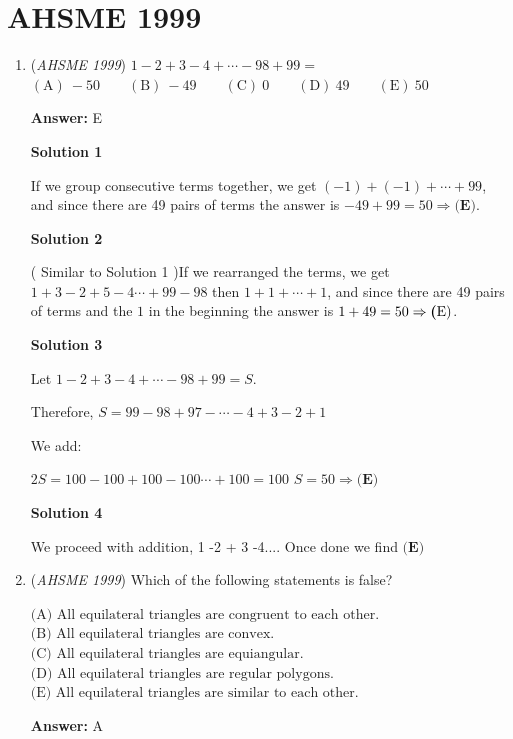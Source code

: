 \section{AHSME 1999}
        \begin{enumerate}
        	\item (\textit{AHSME 1999}) $1 - 2 + 3 -4 + \cdots - 98 + 99 =$
$\mathrm{(A) \ -50 } \qquad \mathrm{(B) \ -49 } \qquad \mathrm{(C) \ 0 } \qquad \mathrm{(D) \ 49 } \qquad \mathrm{(E) \ 50 }$

 \textbf{Answer: }E



\textbf{Solution 1}

If we group consecutive terms together, we get $(-1) + (-1) + \cdots + 99$, and since there are 49 pairs of terms the answer is $-49 + 99 = 50 \Rightarrow \mathrm{\textbf{(E)}}$.

 



\textbf{Solution 2}

( Similar to Solution 1 )If we rearranged the terms, we get $1+3-2+5-4 \cdots + 99-98$ then $1 + 1 + \cdots + 1$, and since there are 49 pairs of terms and the $1$ in the beginning the answer is $1+49 = 50 \Rightarrow \mathrm{\textbf(E)}$.

 



\textbf{Solution 3}

Let $1 - 2 + 3 -4 + \cdots - 98 + 99 = S$.

 Therefore, $S=99-98+97-\cdots -4+3-2+1$

 We add:

 $2S=100-100+100-100\cdots +100=100$
$S=50\Rightarrow \mathrm{\textbf{(E)}}$




\textbf{Solution 4}

We proceed with addition, 1 -2 + 3 -4.... Once done we find $\mathrm{\textbf{(E)}}$



	\item (\textit{AHSME 1999}) Which of the following statements is false?


 $\text{(A) All equilateral triangles are congruent to each other.}$
$\text{(B) All equilateral triangles are convex.}$
$\text{(C) All equilateral triangles are equiangular.}$
$\text{(D) All equilateral triangles are regular polygons.}$
$\text{(E) All equilateral triangles are similar to each other.}$

 \textbf{Answer: }A




\end{enumerate}
